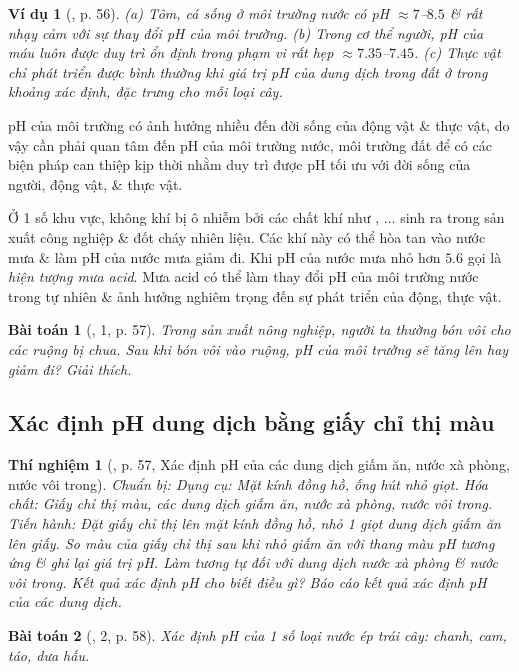 \documentclass{article}
\newtheorem{baitoan}{Bài toán}
\newtheorem{thinghiem}{Thí nghiệm}
\newtheorem{vidu}{Ví dụ}
\begin{document}
\begin{vidu}[\cite{SGK_KHTN_8_Canh_Dieu}, p. 56]
	(a) Tôm, cá sống ở môi trường nước có pH $\approx7$--$8.5$ \& rất nhạy cảm với sự thay đổi pH của môi trường. (b) Trong cơ thể người, pH của máu luôn được duy trì ổn định trong phạm vi rất hẹp $\approx7.35$--$7.45$. (c) Thực vật chỉ phát triển được bình thường khi giá trị pH của dung dịch trong đất ở trong khoảng xác định, đặc trưng cho mỗi loại cây.
\end{vidu}
pH của môi trường có ảnh hưởng nhiều đến đời sống của động vật \& thực vật, do vậy cần phải quan tâm đến pH của môi trường nước, môi trường đất để có các biện pháp can thiệp kịp thời nhằm duy trì được pH tối ưu với đời sống của người, động vật, \& thực vật.

Ở 1 số khu vực, không khí bị ô nhiễm bởi các chất khí như , $\ldots$ sinh ra trong sản xuất công nghiệp \& đốt cháy nhiên liệu. Các khí này có thể hòa tan vào nước mưa \& làm pH của nước mưa giảm đi. Khi pH của nước mưa nhỏ hơn $5.6$ gọi là \textit{hiện tượng mưa acid}. Mưa acid có thể làm thay đổi pH của môi trường nước trong tự nhiên \& ảnh hưởng nghiêm trọng đến sự phát triển của động, thực vật.

\begin{baitoan}[\cite{SGK_KHTN_8_Canh_Dieu}, 1, p. 57]
	Trong sản xuất nông nghiệp, người ta thường bón vôi cho các ruộng bị chua. Sau khi bón vôi vào ruộng, pH của môi trường sẽ tăng lên hay giảm đi? Giải thích.
\end{baitoan}

\subsection{Xác định pH dung dịch bằng giấy chỉ thị màu}

\begin{thinghiem}[\cite{SGK_KHTN_8_Canh_Dieu}, p. 57, Xác định pH của các dung dịch giấm ăn, nước xà phòng, nước vôi trong]
	\emph{Chuẩn bị:} Dụng cụ: Mặt kính đồng hồ, ống hút nhỏ giọt. Hóa chất: Giấy chỉ thị màu, các dung dịch giấm ăn, nước xà phòng, nước vôi trong. \emph{Tiến hành:} Đặt giấy chỉ thị lên mặt kính đồng hồ, nhỏ 1 giọt dung dịch giấm ăn lên giấy. So màu của giấy chỉ thị sau khi nhỏ giấm ăn với thang màu pH tương ứng \& ghi lại giá trị pH. Làm tương tự đối với dung dịch nước xà phòng \& nước vôi trong. Kết quả xác định pH cho biết điều gì? Báo cáo kết quả xác định pH của các dung dịch.
\end{thinghiem}

\begin{baitoan}[\cite{SGK_KHTN_8_Canh_Dieu}, 2, p. 58]
	Xác định pH của 1 số loại nước ép trái cây: chanh, cam, táo, dưa hấu.
\end{baitoan}
\end{document}
